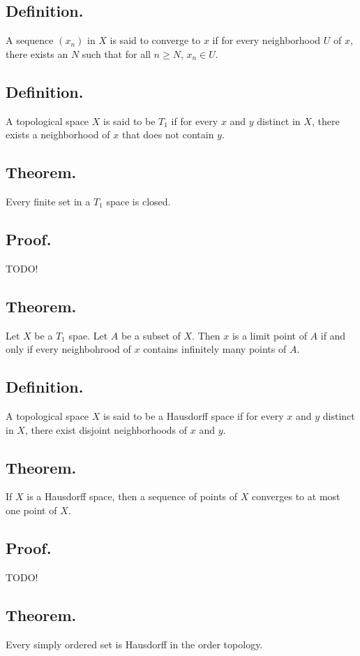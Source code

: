 \documentclass[titlepage]{article}
\begin{document}
\subsection{Definition.} A sequence $(x_{n})$ in $X$ is said to converge to $x$ if for every neighborhood $U$ of $x$, there exists an $N$ such that for all $n \geq N$, $x_{n} \in U$.

\subsection{Definition.} A topological space $X$ is said to be $T_{1}$ if for every $x$ and $y$ distinct in $X$, there exists a neighborhood of $x$ that does not contain $y$.

\subsection{Theorem.} Every finite set in a $T_{1}$ space is closed.

\subsection{Proof.} TODO!

\subsection{Theorem.} Let $X$ be a $T_{1}$ spae. Let $A$ be a subset of $X$. Then $x$ is a limit point of $A$ if and only if every neighbohrood of $x$ contains infinitely many points of $A$.

\subsection{Definition.} A topological space $X$ is said to be a Hausdorff space if for every $x$ and $y$ distinct in $X$, there exist disjoint neighborhoods of $x$ and $y$.

\subsection{Theorem.} If $X$ is a Hausdorff space, then a sequence of points of $X$ converges to at most one point of $X$.

\subsection{Proof.} TODO!

\subsection{Theorem.} Every simply ordered set is Hausdorff in the order topology.
\end{document}
